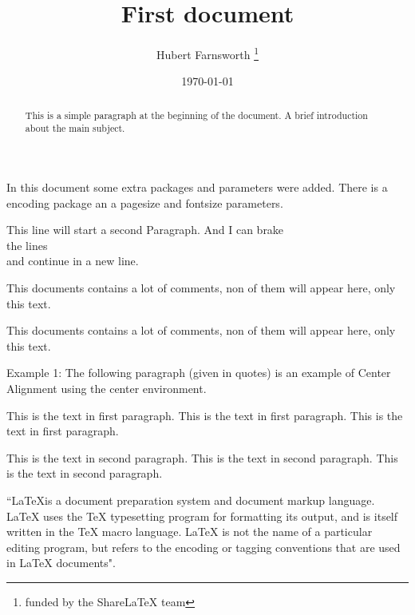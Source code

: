 \documentclass[12pt, letterpaper]{article}
\title{First document}
\author{Hubert Farnsworth \thanks{funded by the ShareLaTeX team}}
\date{\today}
\begin{document}
 
\begin{titlepage}
\maketitle
\end{titlepage}
 
\begin{abstract}
This is a simple paragraph at the beginning of the 
document. A brief introduction about the main subject.
\end{abstract}
\newpage
 
In this document some extra packages and parameters
were added. There is a encoding package
an a pagesize and fontsize parameters.
 
This line will start a second Paragraph. And I can
 brake\\ the lines \\and continue in a new line.

This documents contains a lot of comments, non of them
will appear here, only this text.
 
This documents contains a lot of comments, non of them
will appear here, only this text.
 
\begin{comment}
This text won't show up in the compiled pdf
this is just a multi-line comment. Useful
to, for instance, comment out slow-rendering
while working on the draft.
\end{comment}


\begin{flushright}
Example 1: The following paragraph (given in quotes) is an 
example of Center Alignment using the center environment. 
\end{flushright}
 

\setlength{\parindent}{10ex}
This is the text in first paragraph. This is the text in first 
paragraph. This is the text in first paragraph. \par
\noindent %
This is the text in second paragraph. This is the text in second 
paragraph. This is the text in second paragraph.


\justifying
``\LaTeX is a document preparation system and document markup 
language. LaTeX uses the TeX typesetting program for formatting 
its output, and is itself written in the TeX macro language. 
LaTeX is not the name of a particular editing program, but 
refers to the encoding or tagging conventions that are used 
in LaTeX documents".
\end{document}
